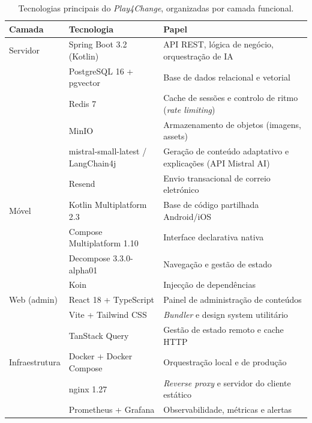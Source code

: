 \begin{table}[htbp]
	\centering
	\small
	\begin{tabular}{p{2.8cm} p{3.8cm} p{6.2cm}}
		\toprule
		\textbf{Camada} & \textbf{Tecnologia} & \textbf{Papel} \\
		\midrule
		Servidor        & Spring Boot 3.2 (Kotlin)    & API REST, lógica de negócio, orquestração de IA \\
		                & PostgreSQL 16 + pgvector    & Base de dados relacional e vetorial \\
		                & Redis 7                     & Cache de sessões e controlo de ritmo (\emph{rate limiting}) \\
		                & MinIO                       & Armazenamento de objetos (imagens, assets) \\
		                & mistral-small-latest / LangChain4j & Geração de conteúdo adaptativo e explicações (API Mistral AI) \\
		                & Resend                      & Envio transacional de correio eletrónico \\
		\addlinespace
		Móvel           & Kotlin Multiplatform 2.3    & Base de código partilhada Android/iOS \\
		                & Compose Multiplatform 1.10  & Interface declarativa nativa \\
		                & Decompose 3.3.0-alpha01               & Navegação e gestão de estado \\
		                & Koin                        & Injecção de dependências \\
		\addlinespace
		Web (admin)     & React 18 + TypeScript       & Painel de administração de conteúdos \\
		                & Vite + Tailwind CSS         & \emph{Bundler} e design system utilitário \\
		                & TanStack Query              & Gestão de estado remoto e cache HTTP \\
		\addlinespace
		Infraestrutura  & Docker + Docker Compose     & Orquestração local e de produção \\
		                & nginx 1.27                  & \emph{Reverse proxy} e servidor do cliente estático \\
		                & Prometheus + Grafana        & Observabilidade, métricas e alertas \\
		\bottomrule
	\end{tabular}
	\caption[Tecnologias utilizadas no Play4Change por camada]{Tecnologias principais do \emph{Play4Change}, organizadas por camada funcional.}
	\label{tab:tecnologias}
\end{table}

